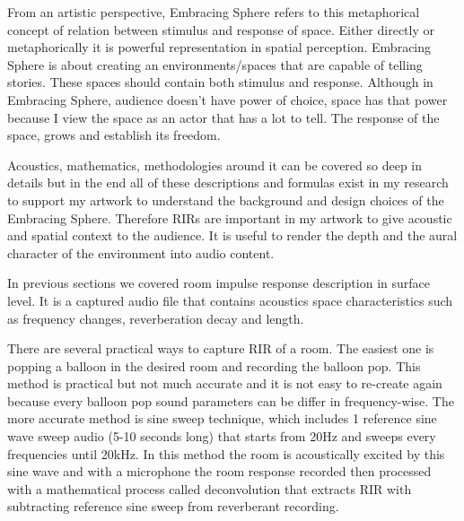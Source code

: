             From an artistic perspective, Embracing Sphere refers to this metaphorical concept of relation between stimulus and response of space. Either directly or metaphorically it is powerful representation in spatial perception. Embracing Sphere is about creating an environments/spaces that are capable of telling stories. These spaces should contain both stimulus and response. Although in Embracing Sphere, audience doesn't have power of choice, space has that power because I view the space as an actor that has a lot to tell. The response of the space, grows and establish its freedom.\par

            Acoustics, mathematics, methodologies around it can be covered so deep in details but in the end all of these descriptions and formulas exist in my research to support my artwork to understand the background and design choices of the Embracing Sphere. Therefore RIRs are important in my artwork to give acoustic and spatial context to the audience. It is useful to render the depth and the aural character of the environment into audio content.\par

            In previous sections we covered room impulse response description in surface level. It is a captured audio file that contains acoustics space characteristics such as frequency changes, reverberation decay and length.\par

            There are several practical ways to capture RIR of a room. The easiest one is popping a balloon in the desired room and recording the balloon pop. This method is practical but not much accurate and it is not easy to re-create again because every balloon pop sound parameters can be differ in frequency-wise\cite{RIR_Swept-Sine_Technique}. The more accurate method is sine sweep technique, which includes 1 reference sine wave sweep audio (5-10 seconds long) that starts from 20Hz and sweeps every frequencies until 20kHz\cite{Auditory_Perception_of_Sound_Sources}. In this method the room is acoustically excited by this sine wave and with a microphone the room response recorded then processed with a mathematical process called deconvolution that extracts RIR with subtracting reference sine sweep from reverberant recording.\par


